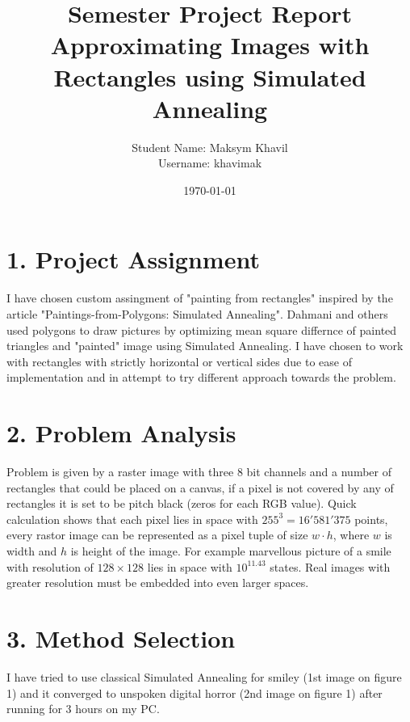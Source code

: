 \documentclass[a4paper,twocolumn]{article}
\title{Semester Project Report\\
Approximating Images with Rectangles using Simulated Annealing
}
\author{
Student Name: Maksym Khavil\\
Username: khavimak
}
\date{\today}
\begin{document}
\maketitle

\section*{1. Project Assignment}

I have chosen custom assingment of "painting from rectangles" inspired by the article "Paintings-from-Polygons: Simulated Annealing". Dahmani and others used polygons to draw pictures by optimizing mean square differnce of painted triangles and "painted" image using Simulated Annealing. I have chosen to work with rectangles with strictly horizontal or vertical sides due to ease of implementation and in attempt to try different approach towards the problem.

\section*{2. Problem Analysis}

Problem is given by a raster image with three 8 bit channels and a number of rectangles that could be placed on a canvas, if a pixel is not covered by any of rectangles it is set to be pitch black (zeros for each RGB value).
Quick calculation shows that each pixel lies in space with $255 ^ 3 = 16'581'375$ points, every rastor image can be represented as a pixel tuple of size $w \cdot h$, where $w$ is width and $h$ is height of the image.
For example marvellous picture of a smile with resolution of $128 \times 128$ lies in space with $10^{11.43}$ states. Real images with greater resolution must be embedded into even larger spaces.

\section*{3. Method Selection}

I have tried to use classical Simulated Annealing for smiley (1st image on figure 1) and it converged to unspoken digital horror (2nd image on figure 1) after running for 3 hours on my PC.
\end{document}

